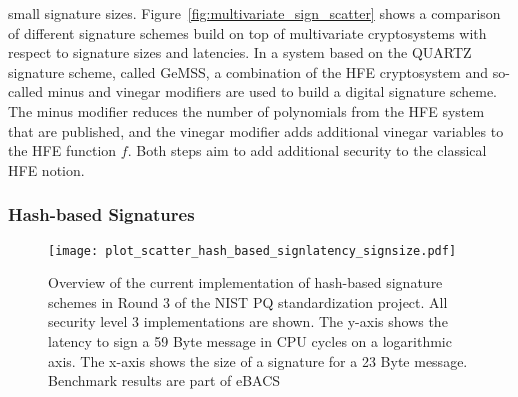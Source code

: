 small signature sizes. Figure~\ref{fig:multivariate_sign_scatter} shows a comparison of different signature schemes build on top of multivariate cryptosystems with respect to signature sizes and latencies. In a system based on the QUARTZ signature scheme, called GeMSS, a combination of the \ac{HFE} cryptosystem and so-called minus and vinegar modifiers are used to build a digital signature scheme. The minus modifier reduces the number of polynomials from the \ac{HFE} system that are published, and the vinegar modifier adds additional vinegar variables to the \ac{HFE} function \(f\). Both steps aim to add additional security to the classical \ac{HFE} notion\cite{patarin2001quartz}.

\subsubsection{Hash-based Signatures}


\begin{figure}[!ht]
    \centering\texttt{[image: plot\_scatter\_hash\_based\_signlatency\_signsize.pdf]}
    \caption{Overview of the current implementation of hash-based signature schemes in Round 3 of the \acs{NIST} \acs{PQ} standardization project. All security level 3 implementations are shown. The y-axis shows the latency to sign a 59 Byte message in \acs{CPU} cycles on a logarithmic axis. The x-axis shows the size of a signature for a 23 Byte message. Benchmark results are part of eBACS\cite{eBACS}}\label{fig:hash_sign_scatter}
\end{figure}

